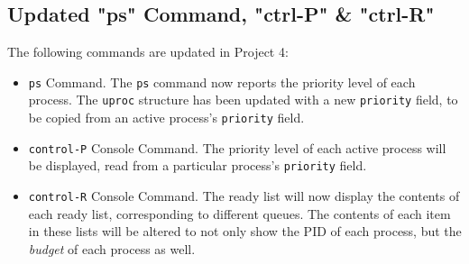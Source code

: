 \documentclass[11pt,letterpaper]{report}
\begin{document}
	\subsection{Updated "ps" Command, "ctrl-P" \& "ctrl-R"}
	The following commands are updated in Project 4:
	\begin{itemize}
		\item {\tt ps} Command. The {\tt ps} command now reports the priority level of each process. The {\tt uproc} structure has been updated with a new {\tt priority} field, to be copied from an active process's {\tt priority} field.
		\item {\tt control-P} Console Command. The priority level of each active process will be displayed, read from a particular process's {\tt priority} field.
		\item {\tt control-R} Console Command. The ready list will now display the contents of each ready list, corresponding to different queues. The contents of each item in these lists will be altered to not only show the PID of each process, but the \emph{budget} of each process as well.
	\end{itemize}
	
\end{document}
